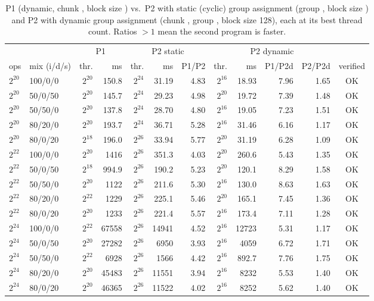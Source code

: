 \begin{table}[H]\centering\scriptsize\setlength{\tabcolsep}{3.5pt}
\caption{P1 (dynamic, chunk \ponechunk, block size \ponebs) vs.\ P2 with static (cyclic) group assignment (group \ptwogroup, block size \ptwobs) and P2 with dynamic group assignment (chunk \ptwodynchunk, group \ptwodyngroup, block size 128), each at its best thread count. Ratios $>1$ mean the second program is faster.}\label{tab:q1final}
\begin{tabular}{ll|rr|rrr|rrrr|c}\toprule
& & \multicolumn{2}{c|}{P1} & \multicolumn{3}{c|}{P2 static} & \multicolumn{4}{c|}{P2 dynamic} & \\
ops & mix (i/d/s) & thr. & ms & thr. & ms & P1/P2 & thr. & ms & P1/P2d & P2/P2d & verified \\\midrule
$2^{20}$ & 100/0/0 & $2^{20}$ & 150.8 & $2^{24}$ & 31.19 & 4.83 & $2^{16}$ & 18.93 & 7.96 & 1.65 & OK \\
$2^{20}$ & 50/0/50 & $2^{20}$ & 145.7 & $2^{24}$ & 29.23 & 4.98 & $2^{20}$ & 19.72 & 7.39 & 1.48 & OK \\
$2^{20}$ & 50/50/0 & $2^{20}$ & 137.8 & $2^{24}$ & 28.70 & 4.80 & $2^{16}$ & 19.05 & 7.23 & 1.51 & OK \\
$2^{20}$ & 80/20/0 & $2^{20}$ & 193.7 & $2^{24}$ & 36.71 & 5.28 & $2^{16}$ & 31.46 & 6.16 & 1.17 & OK \\
$2^{20}$ & 80/0/20 & $2^{18}$ & 196.0 & $2^{26}$ & 33.94 & 5.77 & $2^{20}$ & 31.19 & 6.28 & 1.09 & OK \\
\midrule
$2^{22}$ & 100/0/0 & $2^{20}$ & 1416 & $2^{26}$ & 351.3 & 4.03 & $2^{20}$ & 260.6 & 5.43 & 1.35 & OK \\
$2^{22}$ & 50/0/50 & $2^{18}$ & 994.9 & $2^{26}$ & 190.2 & 5.23 & $2^{20}$ & 120.1 & 8.29 & 1.58 & OK \\
$2^{22}$ & 50/50/0 & $2^{20}$ & 1122 & $2^{26}$ & 211.6 & 5.30 & $2^{16}$ & 130.0 & 8.63 & 1.63 & OK \\
$2^{22}$ & 80/20/0 & $2^{22}$ & 1229 & $2^{26}$ & 225.1 & 5.46 & $2^{20}$ & 165.1 & 7.45 & 1.36 & OK \\
$2^{22}$ & 80/0/20 & $2^{20}$ & 1233 & $2^{26}$ & 221.4 & 5.57 & $2^{16}$ & 173.4 & 7.11 & 1.28 & OK \\
\midrule
$2^{24}$ & 100/0/0 & $2^{22}$ & 67558 & $2^{26}$ & 14941 & 4.52 & $2^{16}$ & 12723 & 5.31 & 1.17 & OK \\
$2^{24}$ & 50/0/50 & $2^{20}$ & 27282 & $2^{26}$ & 6950 & 3.93 & $2^{16}$ & 4059 & 6.72 & 1.71 & OK \\
$2^{24}$ & 50/50/0 & $2^{22}$ & 6928 & $2^{26}$ & 1566 & 4.42 & $2^{16}$ & 892.7 & 7.76 & 1.75 & OK \\
$2^{24}$ & 80/20/0 & $2^{20}$ & 45483 & $2^{26}$ & 11551 & 3.94 & $2^{16}$ & 8232 & 5.53 & 1.40 & OK \\
$2^{24}$ & 80/0/20 & $2^{20}$ & 46365 & $2^{26}$ & 11522 & 4.02 & $2^{16}$ & 8252 & 5.62 & 1.40 & OK \\
\bottomrule\end{tabular}\end{table}
